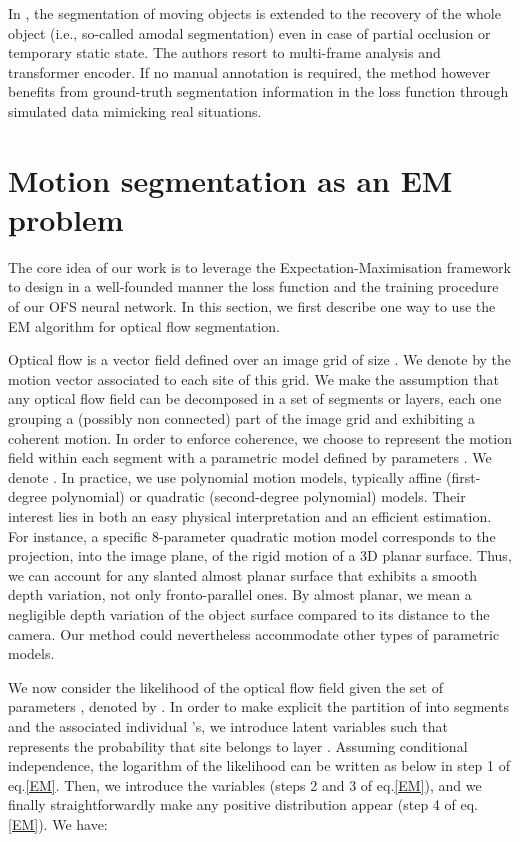\documentclass[10pt,twocolumn,letterpaper]{article}
\begin{document}
In \cite{lamdouar_bmvc_2021}, the segmentation of moving objects is extended to the recovery of the whole object (i.e., so-called amodal segmentation) even in case of partial occlusion or temporary static state. The authors resort to multi-frame analysis and transformer encoder. If no manual annotation is required, {\color{black} the method however benefits from ground-truth segmentation information in the loss function through simulated data mimicking real situations.}





\section{Motion segmentation as an EM problem}
\label{EM-segmentation}
The core idea of our work is to leverage the Expectation-Maximisation framework to design in a well-founded manner the loss function and the training procedure of our OFS neural network. In this section, we first describe one way to use the EM algorithm for optical flow segmentation. 

Optical flow  is a vector field defined over an image grid  of size . We denote by  the motion vector associated to each site  of this grid. We make the assumption that any optical flow field can be decomposed in a set of  segments or layers, each one grouping a (possibly non connected) part of the image grid and exhibiting a coherent motion. In order to enforce coherence, we choose to represent the motion field within each segment  with a parametric model defined by parameters . We denote . In practice, we use polynomial motion models, typically affine (first-degree polynomial) or quadratic (second-degree polynomial) models. Their interest lies in both an easy physical interpretation and an efficient estimation. For instance, a specific 8-parameter quadratic motion model corresponds to the projection, into the image plane, of the rigid motion of a 3D planar surface. {\color{black} Thus, we can account for any slanted almost planar surface that exhibits a smooth depth variation, not only fronto-parallel ones. By almost planar, we mean a negligible depth variation of the object surface compared to its distance to the camera.} Our method could nevertheless accommodate other types of parametric models.



We now consider the likelihood of the optical flow field  given the set of parameters , denoted by . In order to make explicit the partition of  into  segments and the associated individual 's, we introduce latent variables  such that  represents the probability that site  belongs to layer . Assuming conditional independence, the logarithm of the likelihood can be written as below in step 1 of eq.\eqref{EM}. Then, we introduce the  variables (steps 2 and 3 of eq.\eqref{EM}), and we finally straightforwardly make any positive distribution  appear (step 4 of eq.\eqref{EM}). We have:
\end{document}
